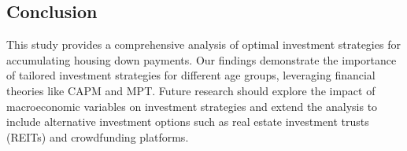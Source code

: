 \subsection{Conclusion}
This study provides a comprehensive analysis of optimal investment strategies for accumulating housing down payments. Our findings demonstrate the importance of tailored investment strategies for different age groups, leveraging financial theories like CAPM and MPT. Future research should explore the impact of macroeconomic variables on investment strategies and extend the analysis to include alternative investment options such as real estate investment trusts (REITs) and crowdfunding platforms.
